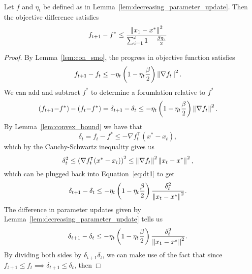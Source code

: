 \begin{theorem}
    \label{thm:beta_update}
    Let $f$ and $\eta_t$ be defined as in
    Lemma~\ref{lem:decreasing_parameter_update}. Then the objective difference
    satisfies
    \begin{equation}
        f_{t+1} - f^* \leq  \frac{\left\| x_1 - x^* \right\|^2}{\sum_{i = 1}^t 1 - \frac{\beta\eta_i}{2}}
    \end{equation}
\end{theorem}


\begin{proof}
    By Lemma~\ref{lem:con_smo}, the progress in objective function satisfies
    \begin{equation}
        f_{t+1} - f_t \leq -\eta_t \left( 1 - \eta_t \frac{\beta}{2}
        \right)\left\| \nabla f_t \right\|^2.
    \end{equation}
    We can add and subtract $f^*$ to determine a 
    forumlation relative to $f^*$
    \begin{equation}
        (f_{t+1} {- f^*}) - (f_t {- f^*}) = \delta_{t+1} - \delta_t \leq -\eta_t \left( 1 - \eta_t \frac{\beta}{2}
        \right)\left\| \nabla f_t \right\|^2.
    \end{equation}
    By Lemma~\ref{lem:convex_bound} we have that 
    \begin{equation}
        \delta_t =  f_t - f^* \leq -\nabla f_t^\intercal (x^* - x_t),
    \end{equation}
    which by the Cauchy-Schwartz inequality gives us
    \begin{equation}
        \delta_t^2 \leq {\left(\nabla f_t^\intercal (x^* - x_t)\right)}^2 \leq
        \left\| \nabla f_t \right\|^2\left\| x_t - x^* \right\|^2,
    \end{equation}
    which can be plugged back into Equation~\ref{eq:dt1} to get
    \begin{equation}
        \delta_{t+1} - \delta_t \leq -\eta_t \left( 1 - \eta_t \frac{\beta}{2}
        \right) { \frac{\delta_t^2}{\left\| x_t - x^* \right\|^2}}.
    \end{equation}
    The difference in parameter updates given by
    Lemma~\ref{lem:decreasing_parameter_update} tells us 
    \begin{equation}
        \label{eq:deltabound}
        \delta_{t+1} - \delta_t \leq -\eta_t \left( 1 - \eta_t \frac{\beta}{2}
        \right) \frac{\delta_t^2}{ \left\| x_1 - x^* \right\|^2}.
    \end{equation}
    By dividing both sides by $\delta_{t + 1}\delta_t$, we can make use of the
    fact that since $f_{t+1} \leq f_t \implies \delta_{t+1} \leq \delta_t$, then

\end{proof}
